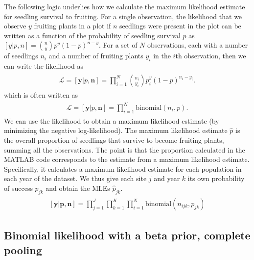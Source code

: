 \documentclass[12pt, oneside, titlepage]{article}   	%
\begin{document}
The following logic underlies how we calculate the maximum likelihood estimate for seedling survival to fruiting. For a single observation, the likelihood that we observe $y$ fruiting plants in a plot if $n$ seedlings were present in the plot can be written as a function of the probability of seedling survival $p$ as $[y|p,n] = \binom{n}{y}p^y(1-p)^{n-y}$. For a set of $N$ observations, each with a number of seedlings $n_i$ and a number of fruiting plants $y_i$ in the $i$th observation, then we can write the likelihood as
%
\begin{align}
  \begin{split}
\mathcal{L} = [\bm{y}|p,\bm{n}]  = \prod_{i=1}^N \binom{n_i}{y_i}p^y_i(1-p)^{n_i-y_i}.
  \end{split}
\end{align}
%
which is often written as
%
\begin{align}
  \begin{split}
\mathcal{L} = [\bm{y}|p,\bm{n}]  = \prod_{i=1}^N \mathrm{binomial}(n_i,p).
  \end{split}
\end{align}
We can use the likelihood to obtain a maximum likelihood estimate (by minimizing the negative log-likelihood). The maximum likelihood estimate $\hat{p}$ is the overall proportion of seedlings that survive to become fruiting plants, summing all the observations. The point is that the proportion calculated in the MATLAB code corresponds to the estimate from a maximum likelihood estimate. Specifically, it calculates a maximum likelihood estimate for each population in each year of the dataset. We thus give each site $j$ and year $k$ its own probability of success $p_{jk}$ and obtain the MLEs $\hat{p}_{jk}$.
%
\begin{align}
  \begin{split}
[\bm{y}|\bm{p},\bm{n}]  = \prod_{j=1}^J\prod_{k=1}^K\prod_{i=1}^N \mathrm{binomial}(n_{ijk},p_{jk}) 
  \end{split}
\end{align}

\subsection*{Binomial likelihood with a beta prior, complete pooling}
\end{document}

